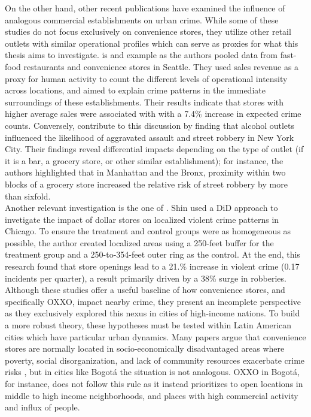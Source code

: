 \documentclass[12pt]{article}
\begin{document}
On the other hand, other recent publications have examined the influence of analogous commercial establishments on urban crime. 
While some of these studies do not focus exclusively on convenience stores, they utilize other retail outlets with similar operational profiles which can serve as proxies for what this thesis aims to investigate. 
\textcite{askey2018fast} is and example as the authors pooled data from fast-food restaurants and convenience stores in Seattle. They used sales revenue as a proxy for human activity to count the different levels of operational intensity across locations, and aimed to explain crime patterns in the immediate surroundings of these establishments. 
Their results indicate that stores with higher average sales were associated with with a 7.4\% increase in expected crime counts. 
Conversely, \cite{feng2019aggravating} contribute to this discussion by finding that alcohol outlets influenced the likelihood of aggravated assault and street robbery in New York City. 
Their findings reveal differential impacts depending on the type of outlet (if it is a bar, a grocery store, or other similar establishment); for instance, the authors highlighted that in Manhattan and the Bronx, proximity within two blocks of a grocery store increased the relative risk of street robbery by more than sixfold.\\ 

Another relevant investigation is the one of \parencite{shin2024dollar}. 
Shin used a DiD approach to invetigate the impact of dollar stores on localized violent crime patterns in Chicago. 
To ensure the treatment and control groups were as homogeneous as possible, the author created localized areas using a 250-feet buffer for the treatment group and a 250-to-354-feet outer ring as the control. 
At the end, this research found that store openings lead to a 21.\% increase in violent crime (0.17 incidents per quarter), a result primarily driven by a 38\% surge in robberies.\\

Although these studies offer a useful baseline of how convenience stores, and specifically OXXO, impact nearby crime, they present an incomplete perspective as they exclusively explored this nexus in cities of high-income nations. 
To build a more robust theory, these hypotheses must be tested within Latin American cities which have particular urban dynamics. Many papers argue that convenience stores are normally located in socio-economically disadvantaged areas where poverty, social disorganization, and lack of community resources exacerbate crime risks \parencite{shin2024dollar, Dugato2026}, but in cities like Bogotá the situation is not analogous. 
OXXO in Bogotá, for instance, does not follow this rule as it instead prioritizes to open locations in middle to high income neighborhoods, and places with high commercial activity and influx of people.\\ 
\end{document}
